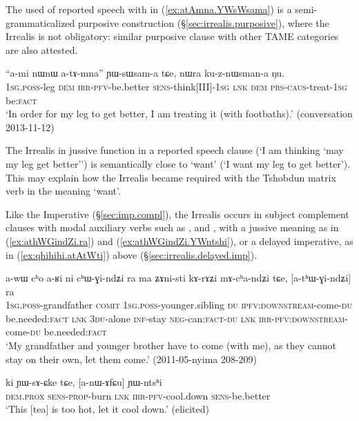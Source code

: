 The used of reported speech with  in (\ref{ex:atAmna.YWsWsama}) is a semi-grammaticalized purposive construction (§\ref{sec:irrealis.purposive}), where the Irrealis is not obligatory: similar purposive clause with other TAME categories are also attested.

\begin{exe}
\ex \label{ex:atAmna.YWsWsama}
\gll  ``a-mi nɯnɯ a-tɤ-mna'' ɲɯ-sɯsam-a tɕe, nɯra ku-z-nɯsman-a ŋu. \\
\textsc{1sg}.\textsc{poss}-leg \textsc{dem} \textsc{irr}-\textsc{pfv}-be.better \textsc{sens}-think[III]-\textsc{1sg} \textsc{lnk} \textsc{dem} \textsc{prs}-\textsc{caus}-treat-\textsc{1sg} be:\textsc{fact} \\
\glt `In order for my leg to get better, I am treating it (with footbaths).' (conversation 2013-11-12)
\end{exe}

The Irrealis in jussive function in a reported speech clause (`I am thinking `may my leg get better'') is semantically close to `want' (`I want my leg to get better'). This may explain how the Irrealis became required with the Tshobdun matrix verb  in the meaning `want'. 


Like the Imperative (§\ref{sec:imp.compl}), the Irrealis occurs in subject complement clauses with modal auxiliary verbs such as ,  and , with a jussive meaning as in (\ref{ex:athWGindZi.ra}) and (\ref{ex:athWGindZi.YWntshi}), or a delayed imperative, as in (\ref{ex:qhihihi.atAtWti}) above (§\ref{sec:irrealis.delayed.imp}).

\begin{exe}
\ex \label{ex:athWGindZi.ra}
\gll a-wɯ cʰo a-ʁi ni cʰɯ-ɣi-ndʑi ra ma  ʑɤni-sti kɤ-rɤʑi mɤ-cʰa-ndʑi tɕe, [a-tʰɯ-ɣi-ndʑi] ra \\
\textsc{1sg}.\textsc{poss}-grandfather \textsc{comit} \textsc{1sg}.\textsc{poss}-younger.sibling \textsc{du} \textsc{ipfv}:\textsc{downstream}-come-\textsc{du} be.needed:\textsc{fact} \textsc{lnk} \textsc{3du}-alone \textsc{inf}-stay \textsc{neg}-can:\textsc{fact}-\textsc{du} \textsc{lnk} \textsc{irr}-\textsc{pfv}:\textsc{downstream}-come-\textsc{du} be.needed:\textsc{fact} \\
\glt `My grandfather and younger brother have to come (with me), as they cannot stay on their own, let them come.' (2011-05-nyima 208-209)
\end{exe}

\begin{exe}
\ex \label{ex:athWGindZi.YWntshi}
\gll ki ɲɯ-sɤ-ɕke tɕe, [a-nɯ-ɤfɕu] ɲɯ-ntsʰi \\
\textsc{dem}.\textsc{prox} \textsc{sens}-\textsc{prop}-burn \textsc{lnk} \textsc{irr}-\textsc{pfv}-cool.down \textsc{sens}-be.better \\
\glt `This [tea] is too hot, let it cool down.' (elicited)
\end{exe}

